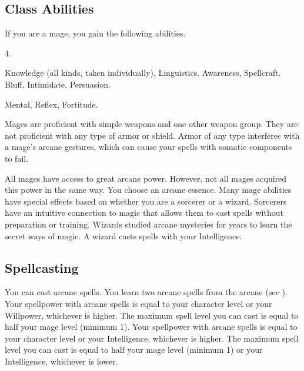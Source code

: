     \subsection{Class Abilities}
        If you are a mage, you gain the following abilities.

         4.

         Knowledge (all kinds, taken individually), Linguistics.
         Awareness, Spellcraft.
         Bluff, Intimidate, Persuasion.

          Mental,  Reflex,  Fortitude.

        Mages are proficient with simple weapons and one other weapon group.
        They are not proficient with any type of armor or shield.
        Armor of any type interferes with a mage's arcane gestures, which can cause your spells with somatic components to fail.

        All mages have access to great arcane power.
        However, not all mages acquired this power in the same way.
        You choose an arcane essence.
        Many mage abilities have special effects based on whether you are a sorcerer or a wizard.
         Sorcerers have an intuitive connection to magic that allows them to cast spells without preparation or training.
         Wizards studied arcane mysteries for years to learn the secret ways of magic.
        A wizard casts spells with your Intelligence.

        \subsection{Spellcasting}

            You can cast arcane spells.
            You learn two arcane spells from the arcane  (see ).
             Your spellpower with arcane spells is equal to your character level or your Willpower, whichever is higher.
            The maximum spell level you can cast is equal to half your mage level (minimum 1).
             Your spellpower with arcane spells is equal to your character level or your Intelligence, whichever is higher.
            The maximum spell level you can cast is equal to half your mage level (minimum 1) or your Intelligence, whichever is lower.

